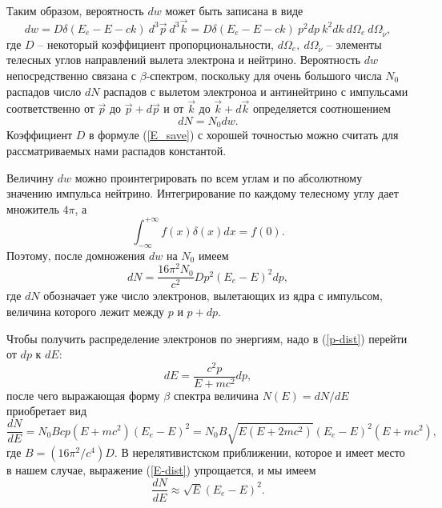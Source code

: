 \documentclass[12pt,a4paper]{article}
\begin{document}
Таким образом, вероятность $dw$ может быть записана в виде
\begin{equation}
dw = D \delta (E_e - E - ck) \  d^3 \vec{p} \  d^3 \vec{k} =  D \delta (E_e - E - ck) \ p^2 dp \ k^2 dk \ d\Omega_e \ d\Omega_{\tilde \nu}, 
\end{equation}
где $D$ -- некоторый коэффициент пропорциональности, $d\Omega_e,\ d\Omega_{\tilde \nu}$ -- элементы телесных углов направлений вылета электрона и нейтрино. Вероятность $dw$ непосредственно связана с $\beta$-спектром, поскольку для очень большого числа $N_0$ распадов число $dN$ распадов с вылетом электроноа и антинейтрино с импульсами соответственно от $\vec{p}$ до $\vec{p} + d\vec{p}$ и от $\vec{k}$ до $\vec{k} + d\vec{k}$ определяется соотношением 
\begin{equation}
dN = N_0 dw.
\end{equation}
Коэффициент $D$ в формуле (\ref{E_save}) с хорошей точностью можно считать для рассматриваемых нами распадов константой.

Величину $dw$ можно проинтегрировать по всем углам и по абсолютному значению импульса нейтрино. Интегрирование по каждому телесному углу дает множитель $4 \pi$, а 
\begin{equation}
\int_{- \infty} ^{+ \infty} f(x) \delta (x) dx = f(0).
\end{equation}
Поэтому, после домножения $dw$ на $N_0$ имеем
\begin{equation} \label{p-dist}
dN = \frac{16 \pi^2 N_0}{c^2}Dp^2(E_e - E)^2 dp, 
\end{equation}
где $dN$ обозначает уже число электронов, вылетающих из ядра с импульсом, величина которого лежит между $p$  и $p + dp$.

Чтобы получить распределение электронов по энергиям, надо в (\ref{p-dist}) перейти от $dp$ к $dE$:
\begin{equation}
dE = \frac{c^2 p}{E + mc^2} dp,
\end{equation}
после чего выражающая форму $\beta$ спектра величина $N(E) = dN/dE$ приобретает вид
\begin{equation} \label{E-dist}
\frac{dN}{dE} = N_0 B c p (E + mc^2)(E_e - E)^2 = N_0 B \sqrt{E (E + 2mc^2)} (E_e - E)^2 (E + mc^2), 
\end{equation}
где $B = (16 \pi^2 / c^4) D$. В нерелятивистском приближении, которое и имеет место в нашем случае, выражение (\ref{E-dist}) упрощается, и мы имеем
\begin{equation} \label{non-rel-E-dist}
\frac{dN}{dE} \approx \sqrt{E} (E_e - E)^2.
\end{equation}
\end{document}
